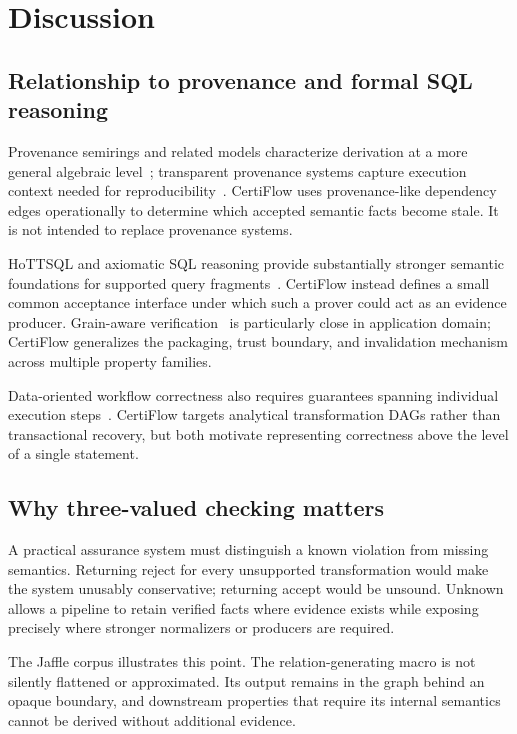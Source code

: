 \section{Discussion}

\subsection{Relationship to provenance and formal SQL reasoning}

Provenance semirings and related models characterize derivation at a more general algebraic level~\cite{green2007provenance}; transparent provenance systems capture execution context needed for reproducibility~\cite{rupprecht2020provenance}. CertiFlow uses provenance-like dependency edges operationally to determine which accepted semantic facts become stale. It is not intended to replace provenance systems.

HoTTSQL and axiomatic SQL reasoning provide substantially stronger semantic foundations for supported query fragments~\cite{chu2017hottsql,chu2017axiomatic}. CertiFlow instead defines a small common acceptance interface under which such a prover could act as an evidence producer. Grain-aware verification~\cite{karayannidis2026grain} is particularly close in application domain; CertiFlow generalizes the packaging, trust boundary, and invalidation mechanism across multiple property families.

Data-oriented workflow correctness also requires guarantees spanning individual execution steps~\cite{stonebraker2026workflow}. CertiFlow targets analytical transformation DAGs rather than transactional recovery, but both motivate representing correctness above the level of a single statement.

\subsection{Why three-valued checking matters}

A practical assurance system must distinguish a known violation from missing semantics. Returning \textsf{reject} for every unsupported transformation would make the system unusably conservative; returning \textsf{accept} would be unsound. \textsf{Unknown} allows a pipeline to retain verified facts where evidence exists while exposing precisely where stronger normalizers or producers are required.

The Jaffle corpus illustrates this point. The relation-generating macro is not silently flattened or approximated. Its output remains in the graph behind an opaque boundary, and downstream properties that require its internal semantics cannot be derived without additional evidence.

